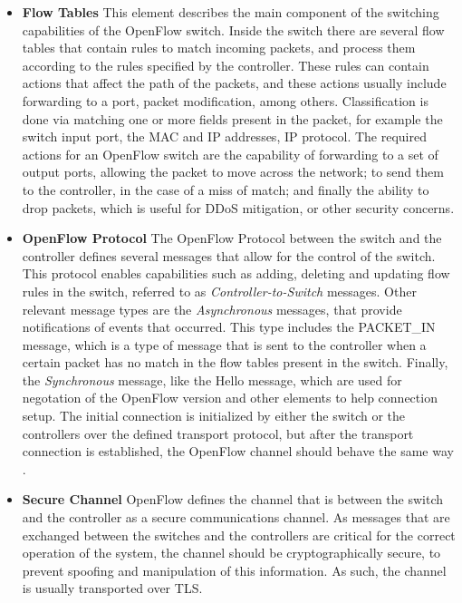 \begin {enumerate}
\begin {itemize}
    \item \textbf {Flow Tables} This element describes the main component of the switching capabilities of the OpenFlow switch. Inside the switch there are several
        flow tables that contain rules to match incoming packets, and process them according to the rules specified by the controller. These rules can
        contain actions that affect the path of the packets, and these actions usually include forwarding to a port, packet modification, among others.
        Classification is done via matching one or more fields present in the packet, for example the switch input port, the MAC and IP addresses, IP protocol.
        The required actions for an OpenFlow switch are the capability of forwarding to a set of output ports, allowing the packet to move across the network;
        to send them to the controller, in the case of a miss of match; and finally the ability to drop packets, which is useful for DDoS mitigation, or other
        security concerns.
    \item \textbf {OpenFlow Protocol} The OpenFlow Protocol between the switch and the controller defines several messages that allow for the control of the switch.
        This protocol enables capabilities such as adding, deleting and updating flow rules in the switch, referred to as \textit {Controller-to-Switch}
        messages. Other relevant message types are the \textit {Asynchronous} messages, that provide notifications of events that occurred. This type includes
        the PACKET\_IN message, which is a type of message that is sent to the controller when a certain packet has no match in
        the flow tables present in the switch. Finally, the \textit{Synchronous} message, like the Hello message, which are used for negotation of the OpenFlow
        version and other elements to help connection setup. The initial connection is initialized by either the switch or the controllers over the defined
        transport protocol, but after the transport connection is established, the OpenFlow channel should behave the same way 
        \cite{open_networking_foundation_openflow_2015}.
    \item \textbf {Secure Channel} OpenFlow defines the channel that is between the switch and the controller as a secure communications channel. As messages 
        that are exchanged between the switches and the controllers are critical for the correct operation of the system, the channel should be cryptographically
        secure, to prevent spoofing and manipulation of this information. As such, the channel is usually transported over TLS.
\end {itemize}


\end{enumerate}
